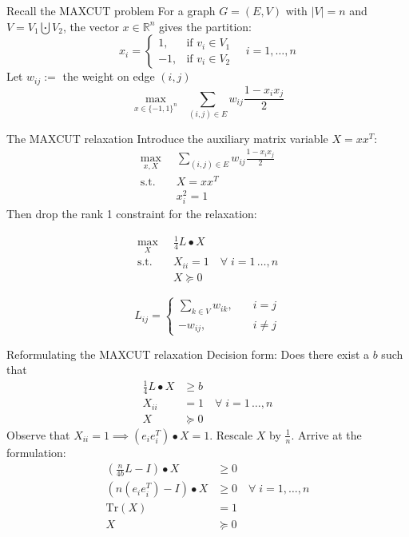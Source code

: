 \documentclass{beamer}
\begin{document}
\begin{frame}{Recall the MAXCUT problem}
For a graph $G = (E,V)$ with $|V| = n$ and $V = V_1 \bigcupdot V_2$, the vector $x \in \mathbb{R}^n$ gives the partition:
$$
x_i = \begin{cases} 1, & \text{if } v_i \in V_1 \\
-1 , & \text{if } v_i \in V_2
\end{cases} \quad i = 1, \dots, n
$$
Let $w_{ij} := $ the weight on edge $(i,j)$
$$
\max_{x \in \{-1,1\}^n}\;\;  \sum_{(i,j) \in E} w_{ij}\frac{1-x_ix_j}{2}
$$
\end{frame}

\begin{frame}{The MAXCUT relaxation}
Introduce the auxiliary matrix variable $X = xx^T$:
\begin{align*}
\max_{x,X} \;\;  & \sum_{(i,j) \in E} w_{ij}\frac{1-x_ix_j}{2} \\
\text{s.t.} \;\; & X = xx^T \\
 & x_i^2 = 1
\end{align*}
Then drop the rank 1 constraint for the relaxation:

\begin{minipage}{0.6\linewidth}


\begin{align*}
\max_{X} \;\;  & \frac{1}{4} L \bullet X \\
\text{s.t.} \;\; & X_{ii} = 1 \quad \forall \; i=1\,\ldots,n\\
 & X \succcurlyeq 0
\end{align*}

\end{minipage}
\begin{minipage}{0.3\linewidth}

$$
L_{ij} = \left\{ \begin{aligned}
\sum _{k\in V} w_{ik},  \quad & i = j \\
-w_{ij}, \quad & i \neq j
\end{aligned}\right.
$$

\end{minipage}
\end{frame}

\begin{frame}{Reformulating the MAXCUT relaxation}
Decision form: Does there exist a $b$ such that
\begin{align*}
\frac{1}{4} L \bullet X &\geq b \\
X_{ii} &= 1 \quad \forall \; i=1\,\ldots,n\\
X &\succcurlyeq 0
\end{align*}
Observe that $X_{ii} = 1 \implies (e_ie_i^T)\bullet X = 1$. Rescale $X$ by $\frac{1}{n}$. Arrive at the formulation:
\begin{align*}
\left(\frac{n}{4b} L - I\right) \bullet X &\geq 0 \\
\left(n(e_ie_i^T) - I\right) \bullet X &\geq 0 \quad \forall \; i = 1,\ldots,n \\
\text{Tr}(X) &= 1 \\
X &\succcurlyeq 0
\end{align*}
\end{frame}
\end{document}
